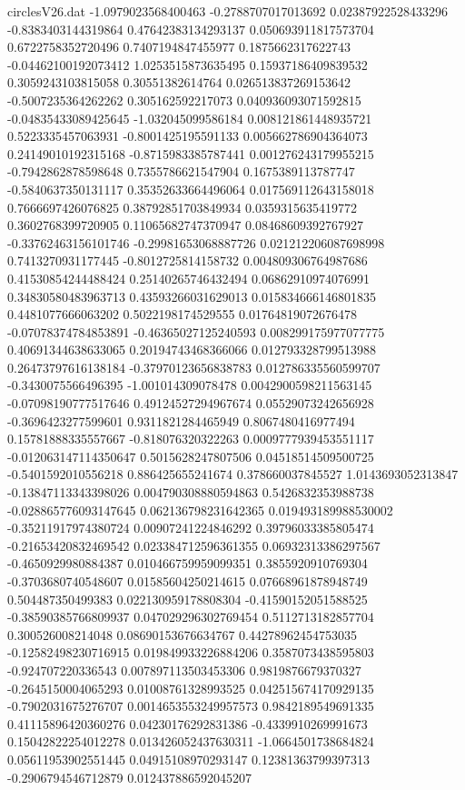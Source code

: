 \begin{filecontents}{circlesV26.dat}
-1.0979023568400463	-0.2788707017013692	0.02387922528433296
-0.8383403144319864	0.47642383134293137	0.050693911817573704
0.6722758352720496	0.7407194847455977	0.1875662317622743
-0.04462100192073412	1.0253515873635495	0.15937186409839532
0.3059243103815058	0.30551382614764	0.026513837269153642
-0.5007235364262262	0.305162592217073	0.040936093071592815
-0.04835433089425645	-1.032045099586184	0.008121861448935721
0.5223335457063931	-0.8001425195591133	0.005662786904364073
0.24149010192315168	-0.8715983385787441	0.001276243179955215
-0.7942862878598648	0.7355786621547904	0.1675389113787747
-0.5840637350131117	0.35352633664496064	0.017569112643158018
0.7666697426076825	0.38792851703849934	0.0359315635419772
0.3602768399720905	0.11065682747370947	0.08468609392767927
-0.33762463156101746	-0.29981653068887726	0.021212206087698998
0.7413270931177445	-0.8012725814158732	0.004809306764987686
0.41530854244488424	0.25140265746432494	0.06862910974076991
0.34830580483963713	0.43593266031629013	0.015834666146801835
0.4481077666063202	0.5022198174529555	0.01764819072676478
-0.07078374784853891	-0.46365027125240593	0.008299175977077775
0.40691344638633065	0.20194743468366066	0.012793328799513988
0.26473797616138184	-0.37970123656838783	0.012786335560599707
-0.3430075566496395	-1.001014309078478	0.0042900598211563145
-0.07098190777517646	0.49124527294967674	0.05529073242656928
-0.3696423277599601	0.9311821284465949	0.8067480416977494
0.15781888335557667	-0.818076320322263	0.0009777939453551117
-0.012063147114350647	0.5015628247807506	0.04518514509500725
-0.5401592010556218	0.886425655241674	0.378660037845527
1.0143693052313847	-0.13847113343398026	0.004790308880594863
0.5426832353988738	-0.028865776093147645	0.062136798231642365
0.019493189988530002	-0.35211917974380724	0.00907241224846292
0.39796033385805474	-0.21653420832469542	0.023384712596361355
0.06932313386297567	-0.4650929980884387	0.010466759959099351
0.3855920910769304	-0.3703680740548607	0.01585604250214615
0.07668961878948749	0.504487350499383	0.022130959178808304
-0.41590152051588525	-0.38590385766809937	0.047029296302769454
0.5112713182857704	0.300526008214048	0.08690153676634767
0.44278962454753035	-0.12582498230716915	0.019849933226884206
0.3587073438595803	-0.924707220336543	0.007897113503453306
0.9819876679370327	-0.2645150004065293	0.01008761328993525
0.042515674170929135	-0.7902031675276707	0.0014653553249957573
0.9842189549691335	0.41115896420360276	0.04230176292831386
-0.4339910269991673	0.15042822254012278	0.013426052437630311
-1.0664501738684824	0.05611953902551445	0.04915108970293147
0.12381363799397313	-0.2906794546712879	0.012437886592045207

\end{filecontents}
